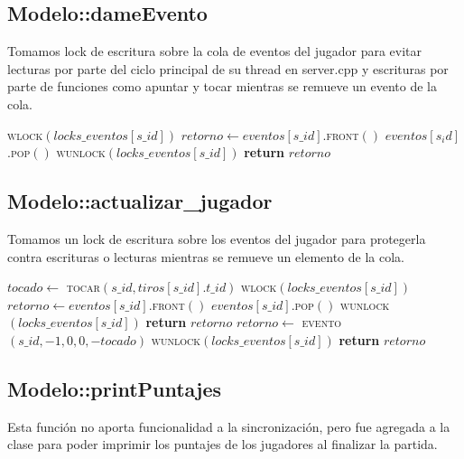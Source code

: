 \documentclass[a4paper,10pt,twoside]{article}
\newenvironment{pseudo}[1][]{%
    \vspace{0.5em}%
    \begin{algorithmic}%
}
{%
    \end{algorithmic}%
    \vspace{0.5em}%
}
\newcommand{\Fn}[2]{\textsc{#1}$(#2)$}
\newcommand{\PReturn}[1]{\textbf{return} $#1$}
\begin{document}
\subsection{Modelo::dameEvento}

Tomamos lock de escritura sobre la cola de eventos del jugador para evitar lecturas por parte del ciclo principal de su thread en server.cpp y escrituras por parte de funciones como apuntar y tocar mientras se remueve un evento de la cola.

\begin{pseudo}
        \State \Fn{wlock}{locks\_eventos[s\_id]}
        \State $retorno \leftarrow eventos[s\_id]$.\Fn{front}{}
        \State $eventos[s_id]$.\Fn{pop}{}
        \State \Fn{wunlock}{locks\_eventos[s\_id]}
        \State \PReturn{retorno}
    \EndProcedure
\end{pseudo}


\subsection{Modelo::actualizar\_jugador}

Tomamos un lock de escritura sobre los eventos del jugador para protegerla contra escrituras o lecturas
mientras se remueve un elemento de la cola. 

\begin{pseudo}
        \State $tocado \leftarrow$ \Fn{tocar}{s\_id, tiros[s\_id].t\_id}
        \State \Fn{wlock}{locks\_eventos[s\_id]}
        \If{$eventos[s\_id]$.\Fn{size}{} $> 0$}
            \State $retorno \leftarrow eventos[s\_id]$.\Fn{front}{}
            \State $eventos[s\_id]$.\Fn{pop}{}
            \State \Fn{wunlock}{locks\_eventos[s\_id]}
            \State \PReturn{retorno}
        \Else
            \State $retorno \leftarrow$ \Fn{evento}{s\_id, -1, 0, 0, -tocado}
            \State \Fn{wunlock}{locks\_eventos[s\_id]}
            \State \PReturn{retorno}
        \EndIf
    \EndProcedure
\end{pseudo}


\subsection{Modelo::printPuntajes}

Esta función no aporta funcionalidad a la sincronización, pero fue agregada a la clase para poder imprimir los puntajes de los jugadores al finalizar la partida.
\end{document}
